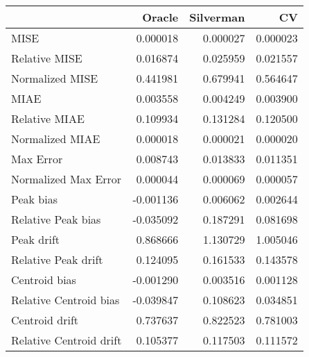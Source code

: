 \begin{tabular}{lrrr}
  \hline
 & Oracle & Silverman & CV \\ 
  \hline
MISE & 0.000018 & 0.000027 & 0.000023 \\ 
  Relative MISE & 0.016874 & 0.025959 & 0.021557 \\ 
  Normalized MISE & 0.441981 & 0.679941 & 0.564647 \\ 
  MIAE & 0.003558 & 0.004249 & 0.003900 \\ 
  Relative MIAE & 0.109934 & 0.131284 & 0.120500 \\ 
  Normalized MIAE & 0.000018 & 0.000021 & 0.000020 \\ 
  Max Error & 0.008743 & 0.013833 & 0.011351 \\ 
  Normalized Max Error & 0.000044 & 0.000069 & 0.000057 \\ 
  Peak bias & -0.001136 & 0.006062 & 0.002644 \\ 
  Relative Peak bias & -0.035092 & 0.187291 & 0.081698 \\ 
  Peak drift & 0.868666 & 1.130729 & 1.005046 \\ 
  Relative Peak drift & 0.124095 & 0.161533 & 0.143578 \\ 
  Centroid bias & -0.001290 & 0.003516 & 0.001128 \\ 
  Relative Centroid bias & -0.039847 & 0.108623 & 0.034851 \\ 
  Centroid drift & 0.737637 & 0.822523 & 0.781003 \\ 
  Relative Centroid drift & 0.105377 & 0.117503 & 0.111572 \\ 
   \hline
\end{tabular}
